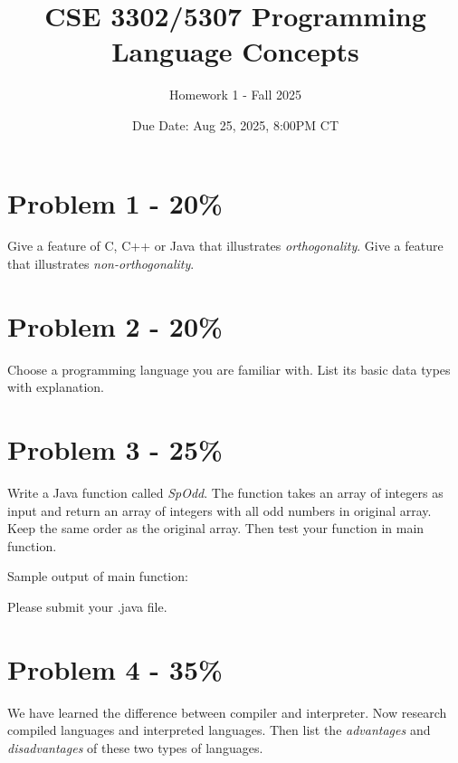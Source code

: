 \documentclass{article}
\begin{document}
\title{CSE 3302/5307 Programming Language Concepts}
\author{Homework 1 - Fall 2025}
\date{Due Date: Aug 25, 2025, 8:00PM CT}
\maketitle
\thispagestyle{fancy}
\section*{Problem 1 - 20\%}
{ Give a feature of C, C++ or Java that illustrates \textit{orthogonality}. Give a feature that illustrates \textit{non-orthogonality}.}

\section*{Problem 2 - 20\%}
{ Choose a programming language you are familiar with. List its basic data types with explanation.}

\section*{Problem 3 - 25\%}
Write a Java function called \textit{SpOdd}. The function takes an array of integers as input and return an array of integers with all odd numbers in original array. Keep the same order as the original array. Then test your function in main function.
	
Sample output of main function:

Please submit your .java file.

\section*{Problem 4 - 35\%}
{ We have learned the difference between compiler and interpreter. Now research compiled languages and interpreted languages. Then list the \textit{advantages} and \textit{disadvantages} of these two types of languages.}
\end{document}
